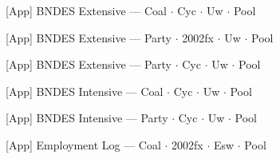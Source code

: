 \documentclass[aspectratio=169,10pt]{beamer}
\newcommand{\tabledir}{../tables/firm}
\begin{document}
\begin{frame}[t,shrink=5]{[App] BNDES Extensive --- Coal $\cdot$ Cyc $\cdot$ Uw $\cdot$ Pool}
\begin{center}\footnotesize

\end{center}
\end{frame}

\begin{frame}[t,shrink=5]{[App] BNDES Extensive --- Party $\cdot$ 2002fx $\cdot$ Uw $\cdot$ Pool}
\begin{center}\footnotesize

\end{center}
\end{frame}

\begin{frame}[t,shrink=5]{[App] BNDES Extensive --- Party $\cdot$ Cyc $\cdot$ Uw $\cdot$ Pool}
\begin{center}\footnotesize

\end{center}
\end{frame}

\begin{frame}[t,shrink=5]{[App] BNDES Intensive --- Coal $\cdot$ Cyc $\cdot$ Uw $\cdot$ Pool}
\begin{center}\footnotesize

\end{center}
\end{frame}

\begin{frame}[t,shrink=5]{[App] BNDES Intensive --- Party $\cdot$ Cyc $\cdot$ Uw $\cdot$ Pool}
\begin{center}\footnotesize

\end{center}
\end{frame}

\begin{frame}[t,shrink=5]{[App] Employment Log --- Coal $\cdot$ 2002fx $\cdot$ Esw $\cdot$ Pool}
\begin{center}\footnotesize

\end{center}
\end{frame}
\end{document}
